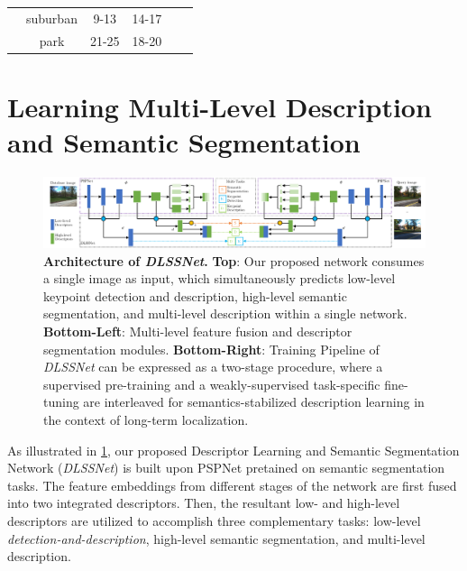 \begin{table}
\begin{tabular}{cccccc}
                                                                                  & suburban  & 9-13                                                   & 14-17                                                  &                                                            &                                                           \\
                                                                                  & park      & 21-25                                                  & 18-20                                                  &                                                            &                                                           \\ \hline
	\end{tabular}
\end{table} 


\section{Learning Multi-Level Description and Semantic Segmentation}

\begin{figure} 
  	\centering
  	\includegraphics[width=\linewidth]{figures/learning/architecture.pdf}
    \caption[Architecture and Training Strategy of {\em DLSSNet}]{ \textbf{Architecture of {\em DLSSNet}.} \textbf{Top}: Our proposed network consumes a single image as input, which simultaneously predicts low-level keypoint detection and description, high-level semantic segmentation, and multi-level description within a single network. \textbf{Bottom-Left}: Multi-level feature fusion and descriptor segmentation modules. \textbf{Bottom-Right}: Training Pipeline of {\em DLSSNet} can be expressed as a two-stage procedure, where a supervised pre-training and a weakly-supervised task-specific fine-tuning are interleaved for semantics-stabilized description learning in the context of long-term localization.
    \label{fig:learning_arch}}
\end{figure}


As illustrated in \ref{fig:learning_arch}, our proposed Descriptor Learning and Semantic Segmentation Network ({\em {\em DLSSNet}}) is built upon PSPNet \cite{li2018pyramid} pretained on semantic segmentation tasks. 
The feature embeddings from different stages of the network are first fused into two integrated descriptors. 
Then, the resultant low- and high-level descriptors are utilized to accomplish three complementary tasks: 
low-level {\em detection-and-description}, high-level semantic segmentation, and 
multi-level description.

